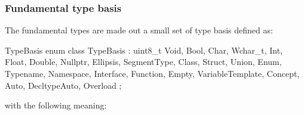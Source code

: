
\subsubsection{Fundamental type basis}
\label{sec:ifc-fundamental-type-basis}

The fundamental types are made out a small set of type basis defined as:
%
\begin{typedef}{TypeBasis}{}
	enum class TypeBasis : uint8_t {
		Void,
		Bool,
		Char,
		Wchar_t,
		Int,
		Float,
		Double,
		Nullptr,
		Ellipsis,
		SegmentType,
		Class,
		Struct,
		Union,
		Enum,
		Typename,
		Namespace,
		Interface,
		Function,
		Empty,
		VariableTemplate,
		Concept,
		Auto,
		DecltypeAuto,
		Overload
	};
\end{typedef}
%
with the following meaning:
